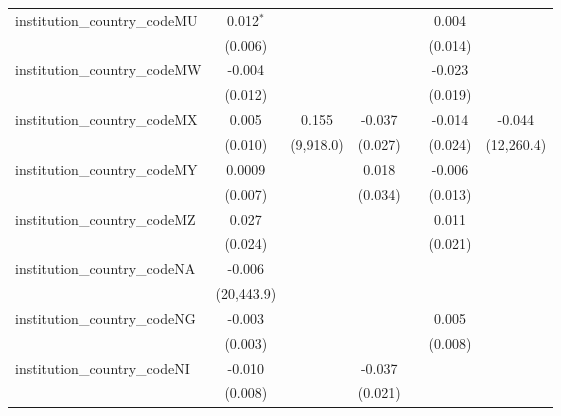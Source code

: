 \begin{tabular}{lcccccc}
   institution\_country\_codeMU          & 0.012$^{*}$    &               &               &              & 0.004        &   \\   
                                         & (0.006)        &               &               &              & (0.014)      &   \\   
   institution\_country\_codeMW          & -0.004         &               &               &              & -0.023       &   \\   
                                         & (0.012)        &               &               &              & (0.019)      &   \\   
   institution\_country\_codeMX          & 0.005          & 0.155         & -0.037        &              & -0.014       & -0.044\\   
                                         & (0.010)        & (9,918.0)     & (0.027)       &              & (0.024)      & (12,260.4)\\   
   institution\_country\_codeMY          & 0.0009         &               & 0.018         &              & -0.006       &   \\   
                                         & (0.007)        &               & (0.034)       &              & (0.013)      &   \\   
   institution\_country\_codeMZ          & 0.027          &               &               &              & 0.011        &   \\   
                                         & (0.024)        &               &               &              & (0.021)      &   \\   
   institution\_country\_codeNA          & -0.006         &               &               &              &              &   \\   
                                         & (20,443.9)     &               &               &              &              &   \\   
   institution\_country\_codeNG          & -0.003         &               &               &              & 0.005        &   \\   
                                         & (0.003)        &               &               &              & (0.008)      &   \\   
   institution\_country\_codeNI          & -0.010         &               & -0.037        &              &              &   \\   
                                         & (0.008)        &               & (0.021)       &              &              &   \\   

\end{tabular}
